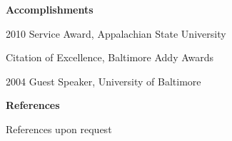 \documentclass[a4paper,12pt,final]{memoir}
\newcommand{\Sep}{\vspace{1.5em}}
\newcommand{\SmallSep}{\vspace{0.5em}}
\newcommand{\CVSection}[1]
	{\Large\textbf{#1}\par
	\SmallSep\normalsize\normalfont}
\begin{document}
\CVSection{Accomplishments}
\begin{compactitem}[\color{BrickRed}$\circ$]
	\item 2010 Service Award, Appalachian State University
	\item Citation of Excellence, Baltimore Addy Awards
	\item 2004 Guest Speaker, University of Baltimore
\end{compactitem}
\Sep

\CVSection{References}
References upon request

\end{document}
